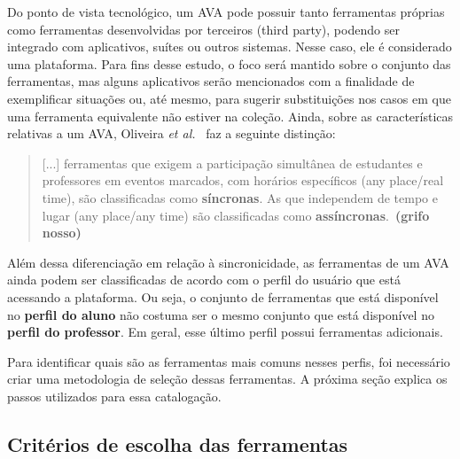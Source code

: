 Do ponto de vista tecnológico, um AVA pode possuir tanto ferramentas próprias como ferramentas desenvolvidas por terceiros (third party), podendo ser integrado com aplicativos, suítes ou outros sistemas. Nesse caso, ele é considerado uma plataforma. Para fins desse estudo, o foco será mantido sobre o conjunto das ferramentas, mas alguns aplicativos serão mencionados com a finalidade de exemplificar situações ou, até mesmo, para sugerir substituições nos casos em que uma ferramenta equivalente não estiver na coleção. Ainda, sobre as características relativas a um AVA, Oliveira \textit{et al.}~\cite{dotta@ead} faz a seguinte distinção:

\begin{quote}
[...] ferramentas que exigem a participação simultânea de estudantes e professores em eventos marcados, com horários específicos (any place/real time), são classificadas como \textbf{síncronas}. As que independem de tempo e lugar (any place/any time) são classificadas como \textbf{assíncronas}.~\cite{dotta@ead}\textbf{(grifo nosso)}
\end{quote}

Além dessa diferenciação em relação à sincronicidade, as ferramentas de um AVA ainda podem ser classificadas de acordo com o perfil do usuário que está acessando a plataforma. Ou seja, o conjunto de ferramentas que está disponível no \textbf{perfil do aluno} não costuma ser o mesmo conjunto que está disponível no \textbf{perfil do professor}. Em geral, esse último perfil possui ferramentas adicionais. 

Para identificar quais são as ferramentas mais comuns nesses perfis, foi necessário criar uma metodologia de seleção dessas ferramentas. A próxima seção explica os passos utilizados para essa catalogação.


\subsection{Critérios de escolha das ferramentas}%


